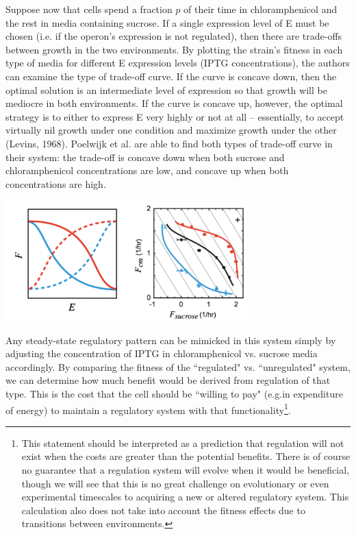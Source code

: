 \documentclass{article}
\begin{document}
Suppose now that cells spend a fraction $p$ of their time in chloramphenicol and the rest in media containing sucrose. If a single expression level of E must be chosen (i.e. if the operon's expression is not regulated), then there are trade-offs between growth in the two environments. By plotting the strain's fitness in each type of media for different E expression levels (IPTG concentrations), the authors can examine the type of trade-off curve. If the curve is concave down, then the optimal solution is an intermediate level of expression so that growth will be mediocre in both environments. If the curve is concave up, however, the optimal strategy is to either to express E very highly or not at all -- essentially, to accept virtually nil growth under one condition and maximize growth under the other (Levins, 1968). Poelwijk et al. are able to find both types of trade-off curve in their system: the trade-off is concave down when both sucrose and chloramphenicol concentrations are low, and concave up when both concentrations are high.

\begin{center}
\includegraphics[width=0.7\textwidth]{tradeoff_curves.pdf}
\end{center}

Any steady-state regulatory pattern can be mimicked in this system simply by adjusting the concentration of IPTG in chloramphenicol vs. sucrose media accordingly. By comparing the fitness of the ``regulated" vs. ``unregulated" system, we can determine how much benefit would be derived from regulation of that type. This is the cost that the cell should be ``willing to pay" (e.g.in expenditure of energy) to maintain a regulatory system with that functionality\footnote{This statement should be interpreted as a prediction that regulation will not exist when the costs are greater than the potential benefits. There is of course no guarantee that a regulation system will evolve when it would be beneficial, though we will see that this is no great challenge on evolutionary or even experimental timescales to acquiring a new or altered regulatory system. This calculation also does not take into account the fitness effects due to transitions between environments.}.
\end{document}

